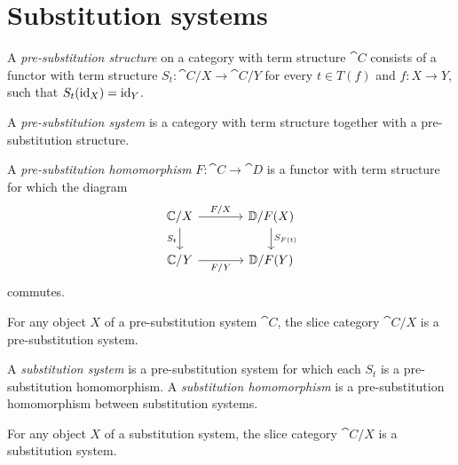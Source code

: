 \section{Substitution systems}

\begin{defn}
A \emph{pre-substitution structure} on a category with term structure $\cat{C}$ consists
of a functor with term structure $S_t:\cat{C}/X\to\cat{C}/Y$ for every $t\in T(f)$ and
$f:X\to Y$, such that $S_t({\mathrm{id}_{X}})={\mathrm{id}_{Y}}$.

A \emph{pre-substitution system} is a category with term structure together with a
pre-substitution structure. 
\end{defn}

\begin{defn}
A \emph{pre-substitution homomorphism} $F:\cat{C}\to\cat{D}$ is a functor with term structure for
which the diagram
\begin{equation*}
\begin{tikzcd}[column sep=large]
\cat{C}/X
  \arrow[r,"F/X"]
  \arrow[d,swap,"S_t"]
  &
\cat{D}/F(X)
  \arrow[d,"S_{F(t)}"]
  \\
\cat{C}/Y
  \arrow[r,swap,"F/Y"]
  &
\cat{D}/F(Y)
\end{tikzcd}
\end{equation*}
commutes.
\end{defn}

\begin{lem}
For any object $X$ of a pre-substitution system $\cat{C}$, the slice category
$\cat{C}/X$ is a pre-substitution system.
\end{lem}

\begin{defn}
A \emph{substitution system} is a pre-substitution system for which each
$S_t$ is a pre-substitution homomorphism. A \emph{substitution homomorphism} is a
pre-substitution homomorphism between substitution systems.
\end{defn}

\begin{cor}
For any object $X$ of a substitution system, the slice category $\cat{C}/X$
is a substitution system.
\end{cor}

